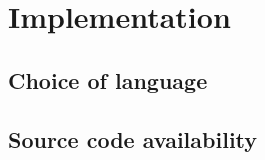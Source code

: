 
\chapter{Implementation}
\label{chp:implementation}

\section{Choice of language}
\label{sec:language}

\section{Source code availability}
\label{sec:sourcecode}

